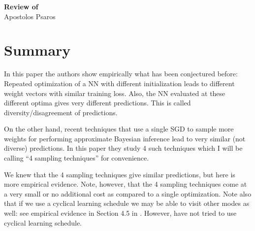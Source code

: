 

\newcommand{\bw}{\boldsymbol{w}}
\newcommand{\bp}{\boldsymbol{p}}
\newcommand{\bth}{\boldsymbol{\theta}}
\newcommand{\bA}{\boldsymbol{A}}
\newcommand{\cH}{\pazocal{H}}
\newcommand{\cN}{\pazocal{N}}
\newcommand{\cP}{\pazocal{P}}
\newcommand{\cD}{\pazocal{D}}
\newcommand{\cO}{\pazocal{O}}
\newcommand{\cL}{\pazocal{L}}


\setcounter{tocdepth}{3}

	
	\sloppy
	
	\begin{center}	
		\large
		\textbf{Review of \textcite{fort2020deep}}\\
		\large
		Apostolos Psaros\\	
	\end{center}
	\vskip 0.25in
	


\section{Summary}\label{sec:introduction}
In this paper the authors show empirically what has been conjectured before:
Repeated optimization of a NN with different initialization leads to different weight vectors with similar training loss. 
Also, the NN evaluated at these different optima gives very different predictions. 
This is called diversity/disagreement of predictions.

On the other hand, recent techniques that use a single SGD to sample more weights for performing approximate Bayesian inference lead to very similar (not diverse) predictions. 
In this paper they study 4 such techniques which I will be calling ``4 sampling techniques'' for convenience. 

We knew that the 4 sampling techniques give similar predictions, but here is more empirical evidence. 
Note, however, that the 4 sampling techniques come at a very small or no additional cost as compared to a single optimization. 
Note also that if we use a cyclical learning schedule we may be able to visit other modes as well: see empirical evidence in Section 4.5 in \textcite{fort2019large}. 
However, \textcite{fort2020deep} have not tried to use cyclical learning schedule. 


